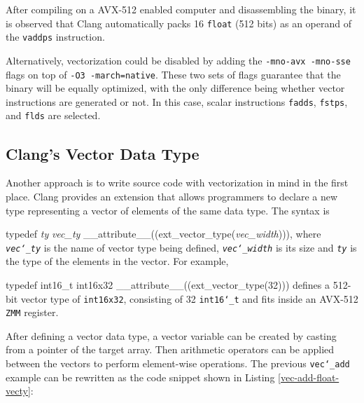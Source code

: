 \documentclass[logo,bsc,singlespacing,parskip]{infthesis}
\newcommand{\dtfloat}{\texttt{float}}
\newcommand{\zmm}{\texttt{ZMM}}
\newenvironment{VerbatimCompact}
  {\vspace*{-2.5mm}\VerbatimEnvironment
   \par\Verbatim}
  {\endVerbatim\vspace*{-2.4mm}}
\begin{document}
After compiling on a AVX-512 enabled computer and disassembling the
binary, it is observed that Clang automatically packs 16 \dtfloat{} (512 bits)
as an operand of the \texttt{vaddps} instruction. 

Alternatively, vectorization could be disabled by adding the \texttt{-mno-avx
-mno-sse} flags on top of \texttt{-O3 -march=native}. These two sets of flags
guarantee that the binary will be equally optimized, with the only difference being whether vector instructions are generated or not. In this case, 
scalar instructions \texttt{fadds}, \texttt{fstps}, and \texttt{flds} are
selected.


\subsection{Clang's Vector Data Type}

Another approach is to write source code with vectorization in mind in the first
place. Clang provides an extension that allows programmers to declare a new type
representing a vector of elements of the same data type. The syntax is 
\begin{VerbatimCompact}[commandchars=\\\{\}]
typedef \textit{ty} \textit{vec_ty} __attribute__((ext_vector_type(\textit{vec_width}))), 
\end{VerbatimCompact}
where \textit{\texttt{vec\char`_ty}} is the name of vector type being defined,
\textit{\texttt{vec\char`_width}} is its size and \textit{\texttt{ty}} is the
type of the elements in the vector. For example, 
\begin{VerbatimCompact}[commandchars=\\\{\}]
typedef int16_t int16x32 __attribute__((ext_vector_type(32)))
\end{VerbatimCompact}
defines a 512-bit vector type of \texttt{int16x32}, consisting of 32
\texttt{int16\char`_t} and fits inside an AVX-512 \zmm{} register. 

After defining a vector data type, a vector variable can be created by casting
from a pointer of the target array. Then arithmetic operators can be applied
between the vectors to perform element-wise operations. The previous
\texttt{vec\char`_add} example can be rewritten as the code snippet shown in Listing
\ref{vec-add-float-vecty}:
\end{document}
